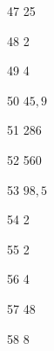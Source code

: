 \begin{loigiaibt}{47}
 25
\end{loigiaibt}
\begin{loigiaibt}{48}
 2
\end{loigiaibt}
\begin{loigiaibt}{49}
 4
\end{loigiaibt}
\begin{loigiaibt}{50}
 $45{,}9$
\end{loigiaibt}
\begin{loigiaibt}{51}
 286
\end{loigiaibt}
\begin{loigiaibt}{52}
 560
\end{loigiaibt}
\begin{loigiaibt}{53}
 $98{,}5$
\end{loigiaibt}
\begin{loigiaibt}{54}
 2
\end{loigiaibt}
\begin{loigiaibt}{55}
 2
\end{loigiaibt}
\begin{loigiaibt}{56}
 4
\end{loigiaibt}
\begin{loigiaibt}{57}
 48
\end{loigiaibt}
\begin{loigiaibt}{58}
 8
\end{loigiaibt}
